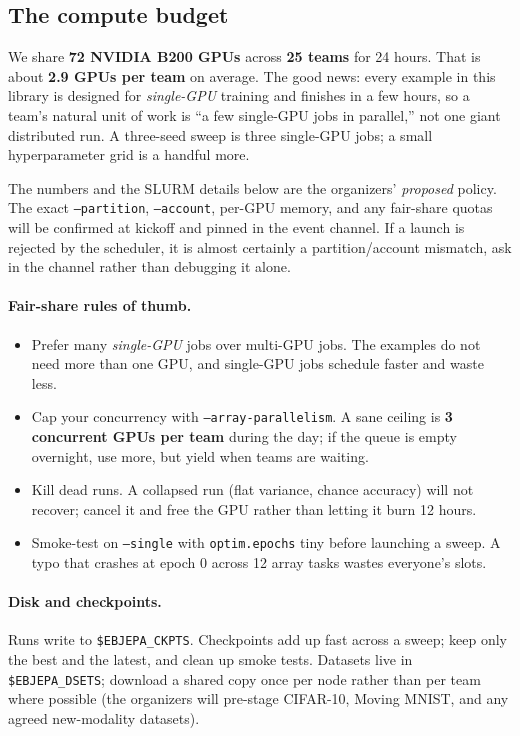 \documentclass{article}
\newcommand{\code}[1]{\texttt{\small #1}}
\begin{document}
\subsection{The compute budget}

We share \textbf{72 NVIDIA B200 GPUs} across \textbf{25 teams} for 24 hours. That
is about \textbf{2.9 GPUs per team} on average. The good news: every example in
this library is designed for \emph{single-GPU} training and finishes in a few
hours, so a team's natural unit of work is ``a few single-GPU jobs in parallel,''
not one giant distributed run. A three-seed sweep is three single-GPU jobs; a small
hyperparameter grid is a handful more.

\begin{notebox}
The numbers and the SLURM details below are the organizers' \emph{proposed}
policy. The exact \code{--partition}, \code{--account}, per-GPU memory, and any
fair-share quotas will be confirmed at kickoff and pinned in the event channel. If
a launch is rejected by the scheduler, it is almost certainly a partition/account
mismatch, ask in the channel rather than debugging it alone.
\end{notebox}

\paragraph{Fair-share rules of thumb.}
\begin{itemize}[leftmargin=1.4em,itemsep=1pt,topsep=2pt]
  \item Prefer many \emph{single-GPU} jobs over multi-GPU jobs. The examples do not
    need more than one GPU, and single-GPU jobs schedule faster and waste less.
  \item Cap your concurrency with \code{--array-parallelism}. A sane ceiling is
    \textbf{3 concurrent GPUs per team} during the day; if the queue is empty
    overnight, use more, but yield when teams are waiting.
  \item Kill dead runs. A collapsed run (flat variance, chance accuracy) will not
    recover; cancel it and free the GPU rather than letting it burn 12 hours.
  \item Smoke-test on \code{--single} with \code{optim.epochs} tiny before
    launching a sweep. A typo that crashes at epoch 0 across 12 array tasks wastes
    everyone's slots.
\end{itemize}

\paragraph{Disk and checkpoints.} Runs write to \code{\$EBJEPA\_CKPTS}. Checkpoints
add up fast across a sweep; keep only the best and the latest, and clean up smoke
tests. Datasets live in \code{\$EBJEPA\_DSETS}; download a shared copy once per
node rather than per team where possible (the organizers will pre-stage CIFAR-10,
Moving MNIST, and any agreed new-modality datasets).
\end{document}
